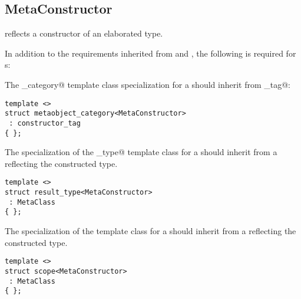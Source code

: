 \subsection{MetaConstructor}
\label{concept-MetaConstructor}

 reflects a constructor of an elaborated type.

In addition to the requirements inherited from  and ,
the following is required for s:

The \verb@metaobject_category@ template class specialization for a  should
inherit from \verb@constructor_tag@:

\begin{verbatim}
template <>
struct metaobject_category<MetaConstructor>
 : constructor_tag
{ };
\end{verbatim}

The specialization of the \verb@result_type@ template class for a  should
inherit from a  reflecting the constructed type.

\begin{verbatim}
template <>
struct result_type<MetaConstructor>
 : MetaClass
{ };
\end{verbatim}

The specialization of the \verb@scope@ template class for a  should
inherit from a  reflecting the constructed type.

\begin{verbatim}
template <>
struct scope<MetaConstructor>
 : MetaClass
{ };
\end{verbatim}

